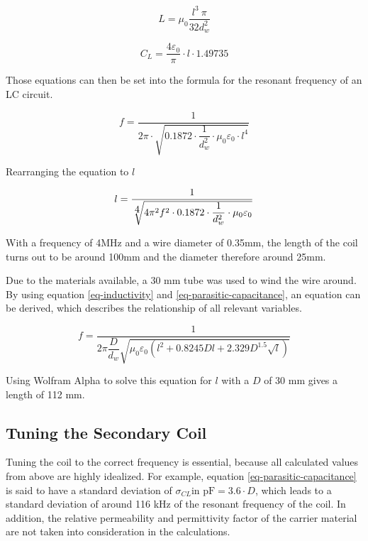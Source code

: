 \begin{equation}
    L = \mu_0 \frac{l^3\ \pi}{32 d_w^2}
\end{equation}

\begin{equation}
    C_L = \frac{4\varepsilon_0}{\pi} \cdot l \cdot 1.49735
\end{equation}

Those equations can then be set into the formula for the resonant frequency of an LC circuit.

\begin{equation}
    f = \frac{1}{2\pi \cdot \sqrt{0.1872 \cdot \dfrac{1}{d_w^2} \cdot \mu_0 \varepsilon_0 \cdot l^4}}
\end{equation}

Rearranging the equation to \(l\)

\begin{equation}
    l = \frac{1}{\sqrt[\scalebox{1}{4}]{4\pi^2 f^2 \cdot0.1872 \cdot \dfrac{1}{d_w^2} \cdot \mu_0 \varepsilon_0}}
\end{equation}

With a frequency of 4MHz and a wire diameter of 0.35mm, the length of the coil turns out to be around 100mm and the diameter therefore around 25mm.

Due to the materials available, a 30 mm tube was used to wind the wire around. By using equation \ref{eq-inductivity} and \ref{eq-parasitic-capacitance}, an equation can be derived, which describes the relationship of all relevant variables.

\begin{equation}
    f = \frac{1}{2\pi \dfrac{D}{d_w} \sqrt{\mu_0 \varepsilon_0 \left( l^2 + 0.8245 D l + 2.329 D^{1.5} \sqrt{l} \right)}}
\end{equation}

Using Wolfram Alpha to solve this equation for \(l\) with a \(D\) of 30 mm gives a length of 112 mm.

\subsection{Tuning the Secondary Coil}\label{TC-tuningTheSecondary}

Tuning the coil to the correct frequency is essential, because all calculated values from above are highly idealized. For example, equation \ref{eq-parasitic-capacitance} is said to have a standard deviation of \(\sigma_{CL} \text{in pF} = 3.6 \cdot D\), which leads to a standard deviation of around 116 kHz of the resonant frequency of the coil. In addition, the relative permeability and permittivity factor of the carrier material are not taken into consideration in the calculations.

